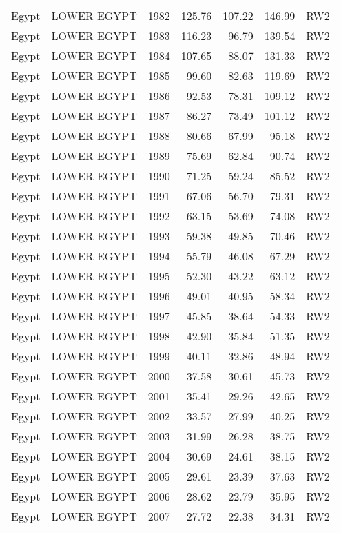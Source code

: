 \begin{longtable}{lllrrrl}
  Egypt & LOWER EGYPT & 1982 & 125.76 & 107.22 & 146.99 & RW2 \\ 
  Egypt & LOWER EGYPT & 1983 & 116.23 & 96.79 & 139.54 & RW2 \\ 
  Egypt & LOWER EGYPT & 1984 & 107.65 & 88.07 & 131.33 & RW2 \\ 
  Egypt & LOWER EGYPT & 1985 & 99.60 & 82.63 & 119.69 & RW2 \\ 
  Egypt & LOWER EGYPT & 1986 & 92.53 & 78.31 & 109.12 & RW2 \\ 
  Egypt & LOWER EGYPT & 1987 & 86.27 & 73.49 & 101.12 & RW2 \\ 
  Egypt & LOWER EGYPT & 1988 & 80.66 & 67.99 & 95.18 & RW2 \\ 
  Egypt & LOWER EGYPT & 1989 & 75.69 & 62.84 & 90.74 & RW2 \\ 
  Egypt & LOWER EGYPT & 1990 & 71.25 & 59.24 & 85.52 & RW2 \\ 
  Egypt & LOWER EGYPT & 1991 & 67.06 & 56.70 & 79.31 & RW2 \\ 
  Egypt & LOWER EGYPT & 1992 & 63.15 & 53.69 & 74.08 & RW2 \\ 
  Egypt & LOWER EGYPT & 1993 & 59.38 & 49.85 & 70.46 & RW2 \\ 
  Egypt & LOWER EGYPT & 1994 & 55.79 & 46.08 & 67.29 & RW2 \\ 
  Egypt & LOWER EGYPT & 1995 & 52.30 & 43.22 & 63.12 & RW2 \\ 
  Egypt & LOWER EGYPT & 1996 & 49.01 & 40.95 & 58.34 & RW2 \\ 
  Egypt & LOWER EGYPT & 1997 & 45.85 & 38.64 & 54.33 & RW2 \\ 
  Egypt & LOWER EGYPT & 1998 & 42.90 & 35.84 & 51.35 & RW2 \\ 
  Egypt & LOWER EGYPT & 1999 & 40.11 & 32.86 & 48.94 & RW2 \\ 
  Egypt & LOWER EGYPT & 2000 & 37.58 & 30.61 & 45.73 & RW2 \\ 
  Egypt & LOWER EGYPT & 2001 & 35.41 & 29.26 & 42.65 & RW2 \\ 
  Egypt & LOWER EGYPT & 2002 & 33.57 & 27.99 & 40.25 & RW2 \\ 
  Egypt & LOWER EGYPT & 2003 & 31.99 & 26.28 & 38.75 & RW2 \\ 
  Egypt & LOWER EGYPT & 2004 & 30.69 & 24.61 & 38.15 & RW2 \\ 
  Egypt & LOWER EGYPT & 2005 & 29.61 & 23.39 & 37.63 & RW2 \\ 
  Egypt & LOWER EGYPT & 2006 & 28.62 & 22.79 & 35.95 & RW2 \\ 
  Egypt & LOWER EGYPT & 2007 & 27.72 & 22.38 & 34.31 & RW2 \\ 

\end{longtable}
